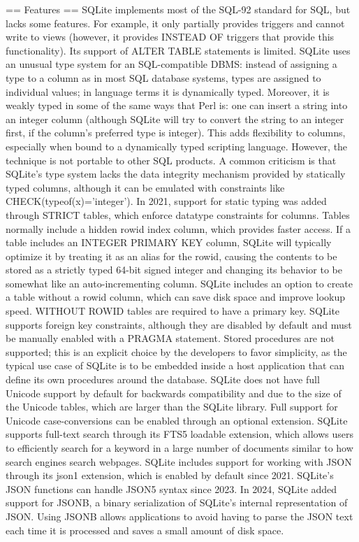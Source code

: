 == Features ==
SQLite implements most of the SQL-92 standard for SQL, but lacks some features. For example, it only partially provides triggers and cannot write to views (however, it provides INSTEAD OF triggers that provide this functionality). Its support of ALTER TABLE statements is limited.
SQLite uses an unusual type system for an SQL-compatible DBMS: instead of assigning a type to a column as in most SQL database systems, types are assigned to individual values; in language terms it is dynamically typed. Moreover, it is weakly typed in some of the same ways that Perl is: one can insert a string into an integer column (although SQLite will try to convert the string to an integer first, if the column's preferred type is integer). This adds flexibility to columns, especially when bound to a dynamically typed scripting language. However, the technique is not portable to other SQL products. A common criticism is that SQLite's type system lacks the data integrity mechanism provided by statically typed columns, although it can be emulated with constraints like CHECK(typeof(x)='integer'). In 2021, support for static typing was added through STRICT tables, which enforce datatype constraints for columns.
Tables normally include a hidden rowid index column, which provides faster access. If a table includes an INTEGER PRIMARY KEY column, SQLite will typically optimize it by treating it as an alias for the rowid, causing the contents to be stored as a strictly typed 64-bit signed integer and changing its behavior to be somewhat like an auto-incrementing column. SQLite includes an option to create a table without a rowid column, which can save disk space and improve lookup speed. WITHOUT ROWID tables are required to have a primary key.
SQLite supports foreign key constraints, although they are disabled by default and must be manually enabled with a PRAGMA statement.
Stored procedures are not supported; this is an explicit choice by the developers to favor simplicity, as the typical use case of SQLite is to be embedded inside a host application that can define its own procedures around the database.
SQLite does not have full Unicode support by default for backwards compatibility and due to the size of the Unicode tables, which are larger than the SQLite library. Full support for Unicode case-conversions can be enabled through an optional extension.
SQLite supports full-text search through its FTS5 loadable extension, which allows users to efficiently search for a keyword in a large number of documents similar to how search engines search webpages.
SQLite includes support for working with JSON through its json1 extension, which is enabled by default since 2021. SQLite's JSON functions can handle JSON5 syntax since 2023. In 2024, SQLite added support for JSONB, a binary serialization of SQLite's internal representation of JSON. Using JSONB allows applications to avoid having to parse the JSON text each time it is processed and saves a small amount of disk space.
